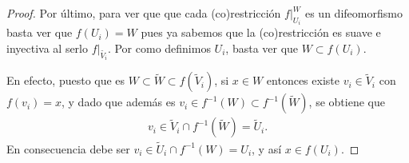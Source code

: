 \documentclass[11pt]{article}
\begin{document}
\begin{proof}
Por último, para ver que que cada (co)restricción $f|_{U_i}^W$ es un difeomorfismo basta ver que $f(U_i) = W$ pues ya sabemos que la (co)restricción es suave e inyectiva al serlo $f|_{\widetilde{V_i}}$. Por como definimos $U_i$, basta ver que $W \subset f(U_i)$. 

En efecto, puesto que es $W \subset \widetilde{W} \subset f(\widetilde{V}_i)$, si $x \in W$ entonces existe $v_i \in \widetilde{V}_i$ con $f(v_i) = x$, y dado que además es $v_i \in f^{-1}(W) \subset f^{-1}(\widetilde{W})$, se obtiene que 
\begin{align*}
v_i \in \widetilde{V}_i \cap f^{-1}(\widetilde{W}) = \widetilde{U}_i.
\end{align*}
En consecuencia debe ser $v_i \in \widetilde{U}_i \cap f^{-1}(W) = U_i$, y así $x \in f(U_i)$.

\end{proof}
\end{document}
